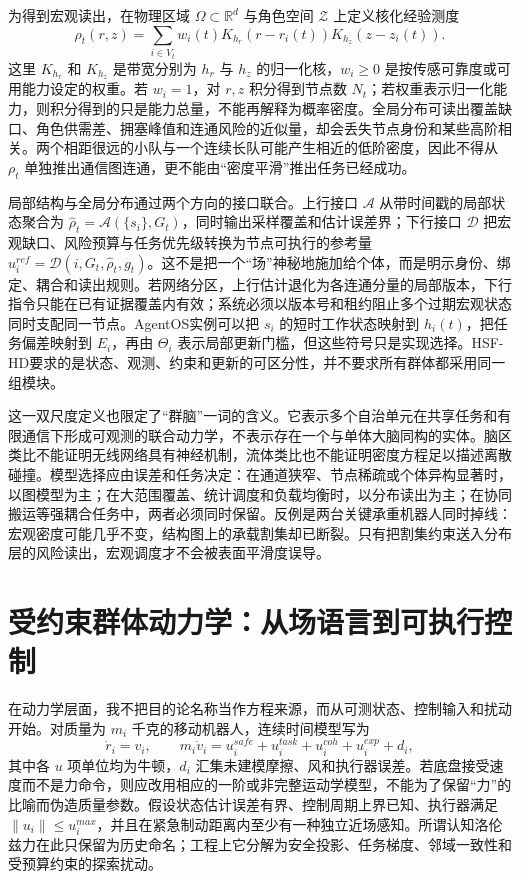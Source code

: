 为得到宏观读出，在物理区域 $\Omega\subset\mathbb R^d$ 与角色空间 $\mathcal Z$ 上定义核化经验测度
\[
 \rho_t(r,z)=\sum_{i\in V_t}w_i(t)K_{h_r}(r-r_i(t))K_{h_z}(z-z_i(t)).
\]
这里 $K_{h_r}$ 和 $K_{h_z}$ 是带宽分别为 $h_r$ 与 $h_z$ 的归一化核，$w_i\ge0$ 是按传感可靠度或可用能力设定的权重。若 $w_i=1$，对 $r,z$ 积分得到节点数 $N_t$；若权重表示归一化能力，则积分得到的只是能力总量，不能再解释为概率密度。全局分布可读出覆盖缺口、角色供需差、拥塞峰值和连通风险的近似量，却会丢失节点身份和某些高阶相关。两个相距很远的小队与一个连续长队可能产生相近的低阶密度，因此不得从 $\rho_t$ 单独推出通信图连通，更不能由“密度平滑”推出任务已经成功。

局部结构与全局分布通过两个方向的接口联合。上行接口 $\mathcal A$ 从带时间戳的局部状态聚合为 $\hat\rho_t=\mathcal A(\{s_i\},G_t)$，同时输出采样覆盖和估计误差界；下行接口 $\mathcal D$ 把宏观缺口、风险预算与任务优先级转换为节点可执行的参考量 $u_i^{ref}=\mathcal D(i,G_t,\hat\rho_t,g_t)$。这不是把一个“场”神秘地施加给个体，而是明示身份、绑定、耦合和读出规则。若网络分区，上行估计退化为各连通分量的局部版本，下行指令只能在已有证据覆盖内有效；系统必须以版本号和租约阻止多个过期宏观状态同时支配同一节点。AgentOS实例可以把 $s_i$ 的短时工作状态映射到 $h_i(t)$，把任务偏差映射到 $E_i$，再由 $\Theta_i$ 表示局部更新门槛，但这些符号只是实现选择。HSF-HD要求的是状态、观测、约束和更新的可区分性，并不要求所有群体都采用同一组模块。

这一双尺度定义也限定了“群脑”一词的含义。它表示多个自治单元在共享任务和有限通信下形成可观测的联合动力学，不表示存在一个与单体大脑同构的实体。脑区类比不能证明无线网络具有神经机制，流体类比也不能证明密度方程足以描述离散碰撞。模型选择应由误差和任务决定：在通道狭窄、节点稀疏或个体异构显著时，以图模型为主；在大范围覆盖、统计调度和负载均衡时，以分布读出为主；在协同搬运等强耦合任务中，两者必须同时保留。反例是两台关键承重机器人同时掉线：宏观密度可能几乎不变，结构图上的承载割集却已断裂。只有把割集约束送入分布层的风险读出，宏观调度才不会被表面平滑度误导。

\section{受约束群体动力学：从场语言到可执行控制}
\label{sec:swarm_dynamics_equation}

在动力学层面，我不把目的论名称当作方程来源，而从可测状态、控制输入和扰动开始。对质量为 $m_i$ 千克的移动机器人，连续时间模型写为
\[
 \dot r_i=v_i,\qquad
 m_i\dot v_i=u_i^{safe}+u_i^{task}+u_i^{coh}+u_i^{exp}+d_i,
\]
其中各 $u$ 项单位均为牛顿，$d_i$ 汇集未建模摩擦、风和执行器误差。若底盘接受速度而不是力命令，则应改用相应的一阶或非完整运动学模型，不能为了保留“力”的比喻而伪造质量参数。假设状态估计误差有界、控制周期上界已知、执行器满足 $\|u_i\|\le u_i^{max}$，并且在紧急制动距离内至少有一种独立近场感知。所谓认知洛伦兹力在此只保留为历史命名；工程上它分解为安全投影、任务梯度、邻域一致性和受预算约束的探索扰动。

